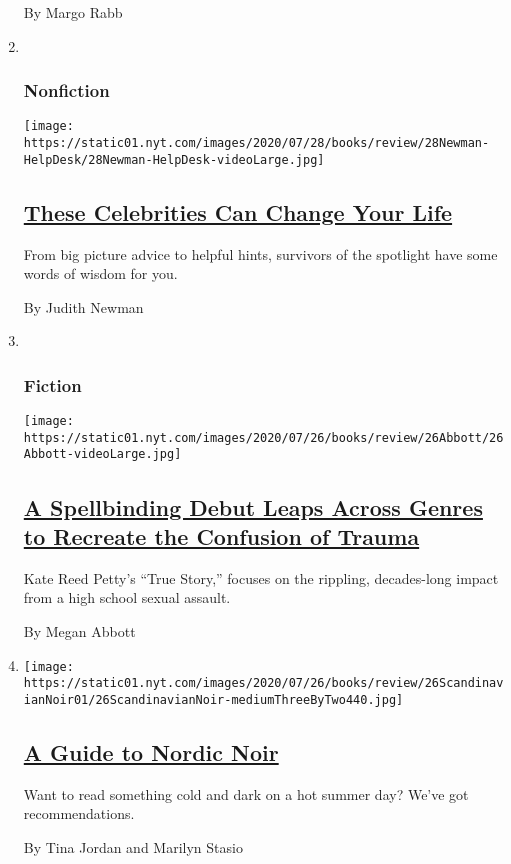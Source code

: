 \begin{enumerate}
  By Margo Rabb
\item ~
  \hypertarget{nonfiction-4}{%
  \subsubsection{Nonfiction}\label{nonfiction-4}}

  \texttt{[image: https://static01.nyt.com/images/2020/07/28/books/review/28Newman-HelpDesk/28Newman-HelpDesk-videoLarge.jpg]}

  \hypertarget{these-celebrities-can-change-your-life}{%
  \subsection{\texorpdfstring{\href{/2020/07/28/books/review/hustle-harder-hustle-smarter-curtis-jackson.html}{These
  Celebrities Can Change Your
  Life}}{These Celebrities Can Change Your Life}}\label{these-celebrities-can-change-your-life}}

  From big picture advice to helpful hints, survivors of the spotlight
  have some words of wisdom for you.

  By Judith Newman
\item ~
  \hypertarget{fiction-2}{%
  \subsubsection{Fiction}\label{fiction-2}}

  \texttt{[image: https://static01.nyt.com/images/2020/07/26/books/review/26Abbott/26Abbott-videoLarge.jpg]}

  \hypertarget{a-spellbinding-debut-leaps-across-genres-to-recreate-the-confusion-of-trauma}{%
  \subsection{\texorpdfstring{\href{/2020/07/24/books/review/kate-reed-petty-true-story.html}{A
  Spellbinding Debut Leaps Across Genres to Recreate the Confusion of
  Trauma}}{A Spellbinding Debut Leaps Across Genres to Recreate the Confusion of Trauma}}\label{a-spellbinding-debut-leaps-across-genres-to-recreate-the-confusion-of-trauma}}

  Kate Reed Petty's ``True Story,'' focuses on the rippling,
  decades-long impact from a high school sexual assault.

  By Megan Abbott
\item
  \texttt{[image: https://static01.nyt.com/images/2020/07/26/books/review/26ScandinavianNoir01/26ScandinavianNoir-mediumThreeByTwo440.jpg]}

  \hypertarget{a-guide-to-nordic-noir}{%
  \subsection{\texorpdfstring{\href{/2020/07/24/books/review/nordic-noir-guide.html}{A
  Guide to Nordic
  Noir}}{A Guide to Nordic Noir}}\label{a-guide-to-nordic-noir}}

  Want to read something cold and dark on a hot summer day? We've got
  recommendations.

  By Tina Jordan and Marilyn Stasio
\end{enumerate}

